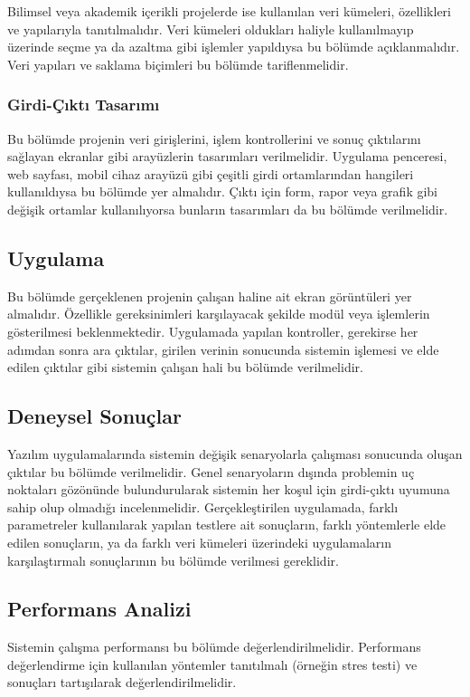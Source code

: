 Bilimsel veya akademik içerikli projelerde ise kullanılan veri kümeleri, özellikleri ve yapılarıyla tanıtılmalıdır. Veri kümeleri oldukları haliyle kullanılmayıp üzerinde seçme ya da azaltma gibi işlemler yapıldıysa bu bölümde açıklanmalıdır. Veri yapıları ve saklama biçimleri bu bölümde tariflenmelidir.

\subsubsection{Girdi-Çıktı Tasarımı}
Bu bölümde projenin veri girişlerini, işlem kontrollerini ve sonuç çıktılarını sağlayan ekranlar gibi arayüzlerin tasarımları verilmelidir. Uygulama penceresi, web sayfası, mobil cihaz arayüzü gibi çeşitli girdi ortamlarından hangileri kullanıldıysa bu bölümde yer almalıdır. Çıktı için form, rapor veya grafik gibi değişik ortamlar kullanılıyorsa bunların tasarımları da bu bölümde verilmelidir.

\subsection{Uygulama}
Bu bölümde gerçeklenen projenin çalışan haline ait ekran görüntüleri yer almalıdır. Özellikle gereksinimleri karşılayacak şekilde modül veya işlemlerin gösterilmesi beklenmektedir. Uygulamada yapılan kontroller, gerekirse her adımdan sonra ara çıktılar, girilen verinin sonucunda sistemin işlemesi ve elde edilen çıktılar gibi sistemin çalışan hali bu bölümde verilmelidir.


\subsection{Deneysel Sonuçlar}
Yazılım uygulamalarında sistemin değişik senaryolarla çalışması sonucunda oluşan çıktılar bu bölümde verilmelidir. Genel senaryoların dışında problemin uç noktaları gözönünde bulundurularak sistemin her koşul için girdi-çıktı uyumuna sahip olup olmadığı incelenmelidir.
Gerçekleştirilen uygulamada, farklı parametreler kullanılarak yapılan testlere ait sonuçların, farklı yöntemlerle elde edilen sonuçların, ya da farklı veri kümeleri üzerindeki uygulamaların karşılaştırmalı sonuçlarının bu bölümde verilmesi gereklidir.


\subsection{Performans Analizi}
Sistemin çalışma performansı bu bölümde değerlendirilmelidir. Performans değerlendirme için kullanılan yöntemler tanıtılmalı (örneğin stres testi) ve sonuçları tartışılarak değerlendirilmelidir.

